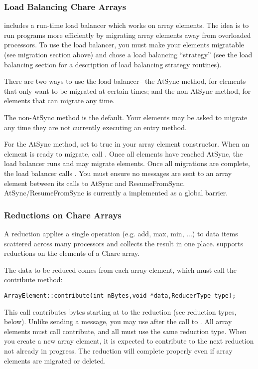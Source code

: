 \subsubsection{Load Balancing Chare Arrays}
\charmpp includes a run-time load balancer which works
on array elements.  The idea is to run programs more efficiently
by migrating array elements away from overloaded processors.
To use the load balancer, you must make your elements migratable
(see migration section above) and chose a load balancing 
``strategy'' (see the load balancing section for a description
of load balancing strategy routines).

There are two ways to use the load balancer-- the AtSync
method, for elements that only want to be migrated at certain
times; and the non-AtSync method, for elements that can migrate
any time.

The non-AtSync method is the default.  Your elements may be
asked to migrate any time they are not currently executing
an entry method.

For the AtSync method, set  to true in your 
array element constructor.  When an element is ready to migrate,
call .  Once all elements have reached AtSync, 
the load balancer runs and may migrate elements.  Once
all migrations are complete, the load balancer calls 
.  You must ensure no messages are
sent to an array element between its calls to AtSync and ResumeFromSync.
AtSync/ResumeFromSync is currently a implemented as a global barrier.



\subsubsection{Reductions on Chare Arrays}
A reduction applies a single operation (e.g. add, max, min, ...) to data items scattered across many processors and collects the result in one place.  \charmpp supports reductions on the elements of a Chare array.

The data to be reduced comes from each array element, which must call the contribute method:
\begin{verbatim}
ArrayElement::contribute(int nBytes,void *data,ReducerType type);
\end{verbatim}

This call contributes  bytes starting at  to the reduction  (see reduction types, below).  Unlike sending a message, you may use  after the call to .  All array elements must call contribute, and all must use the same reduction type.  When you create a new array element, it is expected to contribute to the next reduction not already in progress.  The reduction will complete properly even if array elements are migrated or deleted.

